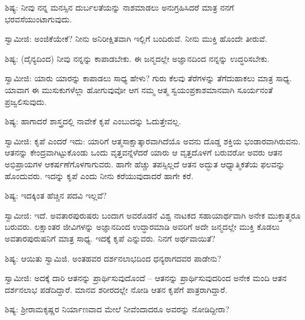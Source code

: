 ಶಿಷ್ಯ: ನೀವು ನನ್ನ ಮನಸ್ಸಿನ ದುರ್ಬಲತೆಯನ್ನು ನಾಶಮಾಡಲು ಅನುಗ್ರಹಿಸಿದರೆ ಮಾತ್ರ ನನಗೆ ಭರವಸೆಯುಂಟಾಗುವುದು.

ಸ್ವಾಮೀಜಿ: ಅಂಜಿಕೆಯೇಕೆ? ನೀನು ಅನಿರೀಕ್ಷಿತವಾಗಿ ಇಲ್ಲಿಗೆ ಬಂದಿರುವೆ. ನೀನು ಮುಕ್ತಿ ಹೊಂದೇ ತೀರುವೆ.

ಶಿಷ್ಯ: (ದೈನ್ಯದಿಂದ) ನೀವು ನನ್ನನ್ನು ಕಾಪಾಡಬೇಕು. ಈ ಜನ್ಮದಲ್ಲೇ ಅಜ್ಞಾನದಿಂದ ನನ್ನನ್ನು ಉದ್ಧರಿಸಬೇಕು.

ಸ್ವಾಮೀಜಿ: ಯಾರು ಯಾರನ್ನು ಕಾಪಾಡಲು ಸಾಧ್ಯ ಹೇಳು? ಗುರು ಕೆಲವು ತೆರೆಗಳನ್ನು ತೆಗೆದುಹಾಕಲು ಮಾತ್ರ ಸಾಧ್ಯ. ಯಾವಾಗ ಈ ಮುಸುಕುಗಳೆಲ್ಲಾ ಹೋಗುವುವೋ ಆಗ ನಮ್ಮ ಆತ್ಮ ಸ್ವಯಂಪ್ರಕಾಶಮಾನವಾಗಿ ಸೂರ್ಯನಂತೆ ಪ್ರಜ್ವಲಿಸುವುದು.

ಶಿಷ್ಯ: ಹಾಗಾದರೆ ಶಾಸ್ತ್ರದಲ್ಲಿ ನಾವೇಕೆ ಕೃಪೆ ಎಂಬುದನ್ನು ಓದುತ್ತೇವಲ್ಲ.

ಸ್ವಾಮೀಜಿ: ಕೃಪೆ ಎಂದರೆ ಇದು: ಯಾರಿಗೆ ಆತ್ಮಸಾಕ್ಷಾತ್ಕಾರವಾಗಿದೆಯೊ ಅವನು ದೊಡ್ಡ ಶಕ್ತಿಯ ಭಂಡಾರವಾಗಿರುವನು. ಆತನನ್ನು ಕೇಂದ್ರವಾಗಿಟ್ಟುಕೊಂಡು ಒಂದು ವೃತ್ತವನ್ನೆಳೆದರೆ ಯಾರು ಆ ವೃತ್ತದೊಳಗೆ ಬರುವರೋ ಅವರು ಆತನ ಅಭಿಪ್ರಾಯಗಳ ಆಕರ್ಷಣೆಗೊಳಗಾಗುವರು. ಹಾಗೇ ಹೆಚ್ಚು ತಪಸ್ಸಿಲ್ಲದೆ ಆತನ ಅದ್ಭುತ ಆಧ್ಯಾತ್ಮಿಕತೆಯ ಫಲವನ್ನು ಹೊಂದುವರು. ಇದನ್ನು ಕೃಪೆ ಎಂದು ನೀನು ಕರೆಯುವುದಾದರೆ ಹಾಗೇ ಕರೆ.

ಶಿಷ್ಯ: ಇದಕ್ಕಿಂತ ಹೆಚ್ಚಿನ ಪದವಿ ಇಲ್ಲವೆ?

ಸ್ವಾಮೀಜಿ: ಇದೆ. ಅವತಾರಪುರುಷರು ಬಂದಾಗ ಅವರೊಡನೆ ವಿಶ್ವ ನಾಟಕದ ಸಹಾಯಾರ್ಥವಾಗಿ ಅನೇಕ ಮುಕ್ತಾತ್ಮರೂ ಬರುವರು. ಲಕ್ಷಾಂತರ ಜೀವಿಗಳನ್ನು ಅಜ್ಞಾನದಿಂದ ಉದ್ಧಾರಮಾಡಿ ಅವರಿಗೆ ಅದೇ ಜನ್ಮದಲ್ಲೇ ಮುಕ್ತಿ ಕೊಡಲು ಅವತಾರಪುರುಷನಿಗೆ ಮಾತ್ರ ಸಾಧ್ಯ. ಇದಕ್ಕೆ ಕೃಪೆ ಎನ್ನುವರು. ನಿನಗೆ ಅರ್ಥವಾಯಿತೆ?

ಶಿಷ್ಯ: ಆಯಿತು ಸ್ವಾಮಿಜಿ. ಅಂತಹವರ ದರ್ಶನಲಾಭದಿಂದ ಧನ್ಯರಾಗದವರ ಪಾಡೇನು?

ಸ್ವಾಮೀಜಿ: ಅದಕ್ಕೆ ದಾರಿ ಆತನನ್ನು ಪ್ರಾರ್ಥಿಸುವುದೊಂದೆ – ಆತನನ್ನು ಪ್ರಾರ್ಥಿಸುವುದರಿಂದ ಅನೇಕ ಮಂದಿ ಆತನ ದರ್ಶನಲಾಭ ಪಡೆದಿದ್ದಾರೆ. ಮಾನವ ಶರೀರದಲ್ಲೇ ನೋಡಿ ಆತನ ಕೃಪೆಗೆ ಪಾತ್ರರಾಗಿದ್ದಾರೆ.

ಶಿಷ್ಯ: ಶ‍್ರೀರಾಮಕೃಷ್ಣರ ನಿರ್ಯಾಣವಾದ ಮೇಲೆ ನೀವೆಂದಾದರೂ ಅವರನ್ನು ನೋಡಿದ್ದೀರಾ?

